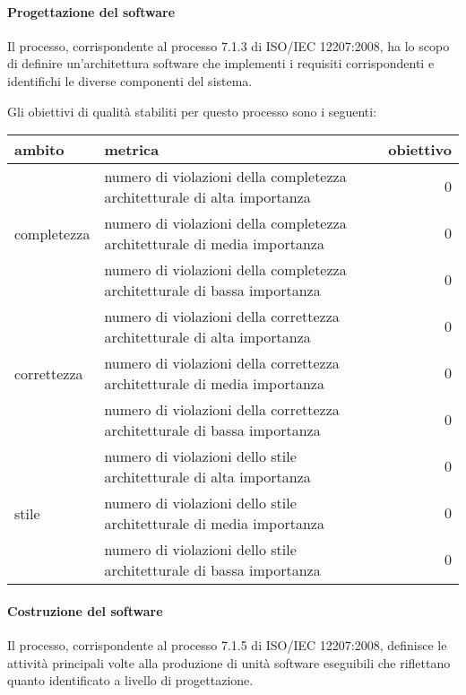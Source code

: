 \paragraph{Progettazione del software}
Il processo, corrispondente al processo 7.1.3 di ISO/IEC 12207:2008, ha lo scopo di definire un'architettura software che implementi i requisiti corrispondenti e identifichi le diverse componenti del sistema.

Gli obiettivi di qualità stabiliti per questo processo sono i seguenti:
\begin{center}
\begin{tabular}{| l | p{6cm} | r |}
	\hline
	\textbf{ambito} & \textbf{metrica} & \textbf{obiettivo} \\
	\hline
	\multirow{3}{*}{completezza} & numero di violazioni della completezza architetturale di alta importanza & $0$ \\
	& numero di violazioni della completezza architetturale di media importanza & $0$ \\
	& numero di violazioni della completezza architetturale di bassa importanza & $0$ \\
	\hline
	\multirow{3}{*}{correttezza} & numero di violazioni della correttezza architetturale di alta importanza & $0$ \\
	& numero di violazioni della correttezza architetturale di media importanza & $0$ \\
	& numero di violazioni della correttezza architetturale di bassa importanza & $0$ \\
	\hline
	\multirow{3}{*}{stile} & numero di violazioni dello stile architetturale di alta importanza & $0$ \\
	& numero di violazioni dello stile architetturale di media importanza & $0$ \\
	& numero di violazioni dello stile architetturale di bassa importanza & $0$ \\
	\hline
\end{tabular}
\end{center}

\paragraph{Costruzione del software}
Il processo, corrispondente al processo 7.1.5 di ISO/IEC 12207:2008, definisce le attività principali volte alla produzione di unità software eseguibili che riflettano quanto identificato a livello di progettazione.

